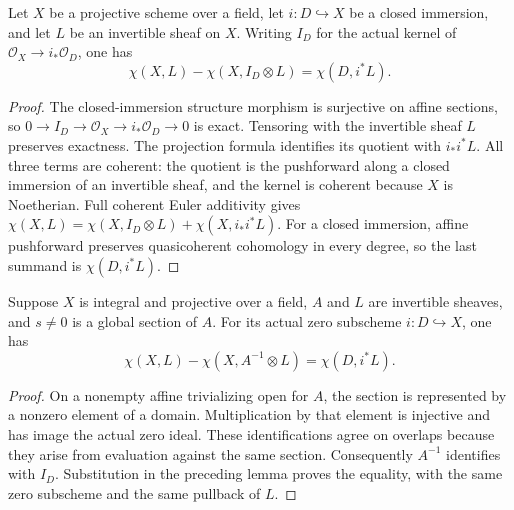 \begin{lemma}
\label{lem:seshadri-closed-cut-euler}
\leanok
Let $X$ be a projective scheme over a field, let $i:D\hookrightarrow X$
be a closed immersion, and let $L$ be an invertible sheaf on $X$.
Writing $I_D$ for the actual kernel of $\mathcal O_X\to i_*\mathcal O_D$,
one has
\[
 \chi(X,L)-\chi(X,I_D\otimes L)=\chi(D,i^*L).
\]
\end{lemma}
\begin{proof}
The closed-immersion structure morphism is surjective on affine sections,
so $0\to I_D\to\mathcal O_X\to i_*\mathcal O_D\to0$ is exact.
Tensoring with the invertible sheaf $L$ preserves exactness. The projection
formula identifies its quotient with $i_*i^*L$. All three terms are coherent:
the quotient is the pushforward along a closed immersion of an invertible
sheaf, and the kernel is coherent because $X$ is Noetherian. Full coherent
Euler additivity gives
$\chi(X,L)=\chi(X,I_D\otimes L)+\chi(X,i_*i^*L)$.
For a closed immersion, affine pushforward preserves quasicoherent
cohomology in every degree, so the last summand is $\chi(D,i^*L)$.
\end{proof}



\begin{lemma}
\label{lem:seshadri-section-cut-euler}
\leanok
{}
Suppose $X$ is integral and projective over a field, $A$ and $L$ are
invertible sheaves, and $s\ne0$ is a global section of $A$.
For its actual zero subscheme $i:D\hookrightarrow X$, one has
\[
 \chi(X,L)-\chi(X,A^{-1}\otimes L)=\chi(D,i^*L).
\]
\end{lemma}
\begin{proof}
On a nonempty affine trivializing open for $A$, the section is represented
by a nonzero element of a domain. Multiplication by that element is
injective and has image the actual zero ideal. These identifications
agree on overlaps because they arise from evaluation against the same
section. Consequently $A^{-1}$ identifies with $I_D$. Substitution in
the preceding lemma proves the equality, with the same zero subscheme
and the same pullback of $L$.
\end{proof}

